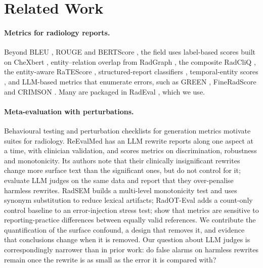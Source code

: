 \documentclass[11pt]{article}
\begin{document}
\section{Related Work}

\paragraph{Metrics for radiology reports.}
Beyond BLEU \citep{papineni-etal-2002-bleu}, ROUGE \citep{lin-2004-rouge} and BERTScore \citep{zhang-etal-2020-bertscore}, the field uses label-based scores built on CheXbert \citep{smit-etal-2020-chexbert}, entity--relation overlap from RadGraph \citep{jain-etal-2021-radgraph}, the composite RadCliQ \citep{yu-etal-2023-evaluating}, the entity-aware RaTEScore \citep{zhao-etal-2024-ratescore}, structured-report classifiers \citep{delbrouck-etal-2025-srr}, temporal-entity scores \citep{zhang-etal-2025-libra}, and LLM-based metrics that enumerate errors, such as GREEN \citep{ostmeier-etal-2024-green}, FineRadScore \citep{huang-etal-2024-fineradscore} and CRIMSON \citep{crimson-2026}. Many are packaged in RadEval \citep{xu-etal-2025-radeval}, which we use.

\paragraph{Meta-evaluation with perturbations.}
Behavioural testing \citep{ribeiro-etal-2020-beyond} and perturbation checklists for generation metrics \citep{sai-etal-2021-perturbation} motivate suites for radiology. ReEvalMed \citep{reevalmed-2025} has an LLM rewrite reports along one aspect at a time, with clinician validation, and scores metrics on discrimination, robustness and monotonicity. Its authors note that their clinically insignificant rewrites change more surface text than the significant ones, but do not control for it; \citet{beyond-scalar-2026} evaluate LLM judges on the same data and report that they over-penalise harmless rewrites. RadSEM \citep{radsem-2026} builds a multi-level monotonicity test and uses synonym substitution to reduce lexical artifacts; RadOT-Eval \citep{radot-2026} adds a count-only control baseline to an error-injection stress test; \citet{reref-2026} show that metrics are sensitive to reporting-practice differences between equally valid references. We contribute the quantification of the surface confound, a design that removes it, and evidence that conclusions change when it is removed. Our question about LLM judges is correspondingly narrower than in prior work: do false alarms on harmless rewrites remain once the rewrite is as small as the error it is compared with?
\end{document}
